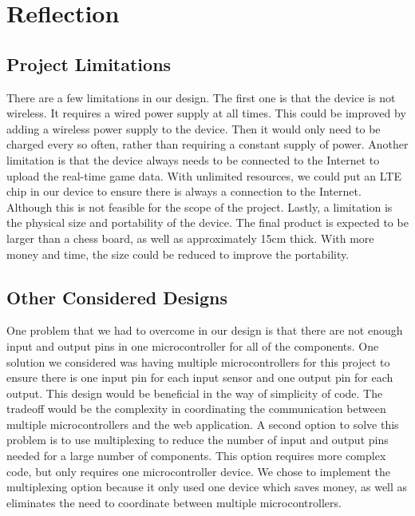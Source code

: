 \documentclass[12pt, titlepage]{article}
\begin{document}
\section{Reflection}

\subsection*{Project Limitations}
There are a few limitations in our design. The first one is that the device is not wireless. It requires a wired power supply at all times. This could be improved by adding a wireless
power supply to the device. Then it would only need to be charged every so often, rather than requiring a constant supply of power. Another limitation is that the device always needs to be connected to
the Internet to upload the real-time game data. With unlimited resources, we could put an LTE chip in our device to ensure there is always a connection to the Internet. Although this is
not feasible for the scope of the project. Lastly, a limitation is the physical size and portability of the device. The final product is expected to be larger than a chess board, as well as
approximately 15cm thick. With more money and time, the size could be reduced to improve the portability.

\subsection*{Other Considered Designs}
One problem that we had to overcome in our design is that there are not enough input and output pins in one microcontroller for all of the components.
One solution we considered was having multiple microcontrollers for this project to ensure there is one input pin for each input sensor and one output pin for each output.
This design would be beneficial in the way of simplicity of code. The tradeoff would be the complexity in coordinating the communication between multiple microcontrollers and the 
web application. A second option to solve this problem is to use multiplexing to reduce the number of input and output pins needed for a large number of components. 
This option requires more complex code, but only requires one microcontroller device. We chose to implement the multiplexing option because it only used one device which saves money,
as well as eliminates the need to coordinate between multiple microcontrollers. 
\end{document}
